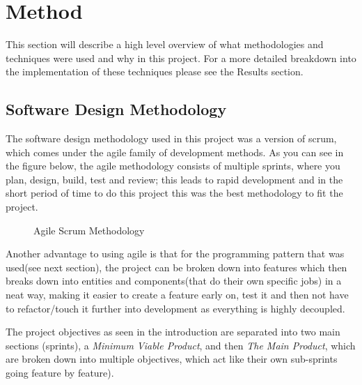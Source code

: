 \documentclass[11pt]{report}
\begin{document}
\chapter{Method}
This section will describe a high level overview of what methodologies and techniques were used and why in this project. For a more detailed breakdown into the implementation of these techniques please see the Results section.
\section{Software Design Methodology}
The software design methodology used in this project was a version of scrum, which comes under the agile family of development methods. As you can see in the figure below\cite{AgileMethodology}, the agile methodology consists of multiple sprints, where you plan, design, build, test and review; this leads to rapid development and in the short period of time to do this project this was the best methodology to fit the project. 
\begin{figure}[H]
    \centering
    \caption{Agile Scrum Methodology}
\end{figure}
Another advantage to using agile is that for the programming pattern that was used(see next section), the project can be broken down into features which then breaks down into entities and components(that do their own specific jobs) in a neat way, making it easier to create a feature early on, test it and then not have to refactor/touch it further into development as everything is highly decoupled. 

The project objectives as seen in the introduction are separated into two main sections (sprints), a \textit{Minimum Viable Product}, and then \textit{The Main Product}, which are broken down into multiple objectives, which act like their own sub-sprints going feature by feature).  
\end{document}
